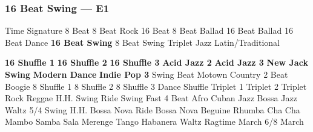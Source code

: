 \subsubsection[16 Beat Swing]{16 Beat Swing --- \UiKey{\II}\UiKey{\MET}E1}
Time Signature
8 Beat
8 Beat Rock
16 Beat
8 Beat Ballad
16 Beat Ballad
16 Beat Dance
\textbf{16 Beat Swing}
8 Beat Swing
Triplet
Jazz
Latin/Traditional





























\textbf{16 Shuffle 1}
\textbf{16 Shuffle 2}
\textbf{16 Shuffle 3}
\textbf{Acid Jazz 2}
\textbf{Acid Jazz 3}
\textbf{New Jack Swing}
\textbf{Modern Dance}
\textbf{Indie Pop 3}
Swing Beat
Motown
Country 2 Beat
Boogie
8 Shuffle 1
8 Shuffle 2
8 Shuffle 3
Dance Shuffle
Triplet 1
Triplet 2
Triplet Rock
Reggae
H.H. Swing
Ride Swing
Fast 4 Beat
Afro Cuban
Jazz Bossa
Jazz Waltz
5/4 Swing
H.H. Bossa Nova
Ride Bossa Nova
Beguine
Rhumba
Cha Cha
Mambo
Samba
Sala
Merenge
Tango
Habanera
Waltz
Ragtime
March
6/8 March
